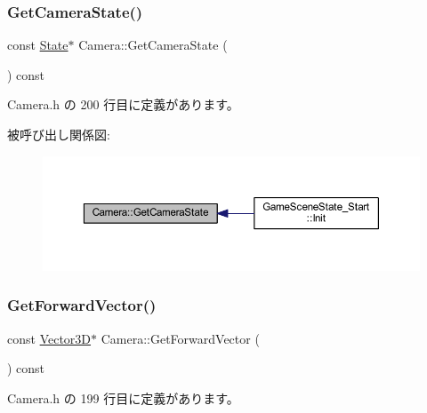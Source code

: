 \subsubsection{\texorpdfstring{Get\+Camera\+State()}{GetCameraState()}}
{\footnotesize\ttfamily const \mbox{\hyperlink{class_camera_1_1_state}{State}}$\ast$ Camera\+::\+Get\+Camera\+State (\begin{DoxyParamCaption}{ }\end{DoxyParamCaption}) const\hspace{0.3cm}{\ttfamily [inline]}}



 Camera.\+h の 200 行目に定義があります。

被呼び出し関係図\+:
\nopagebreak
\begin{figure}[H]
\begin{center}
\leavevmode
\includegraphics[width=350pt]{class_camera_a47e72bd04f7aaac1657d7bce5322b97c_icgraph}
\end{center}
\end{figure}
\mbox{\label{class_camera_aec9441c5c1924df0a0cacbcf28c839e2}} 
\subsubsection{\texorpdfstring{Get\+Forward\+Vector()}{GetForwardVector()}}
{\footnotesize\ttfamily const \mbox{\hyperlink{class_vector3_d}{Vector3D}}$\ast$ Camera\+::\+Get\+Forward\+Vector (\begin{DoxyParamCaption}{ }\end{DoxyParamCaption}) const\hspace{0.3cm}{\ttfamily [inline]}}



 Camera.\+h の 199 行目に定義があります。

